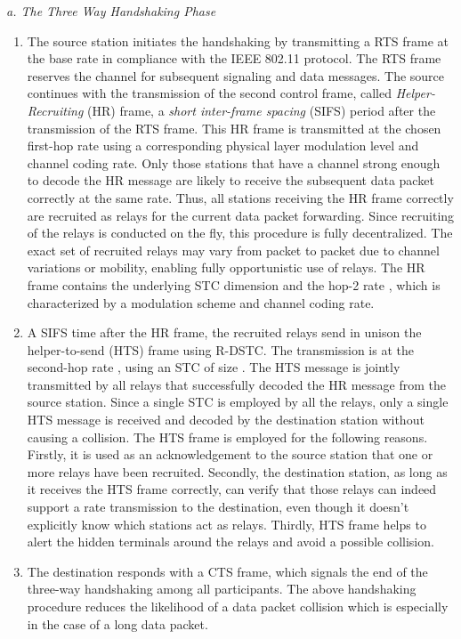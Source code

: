 \documentclass[peerreview,draftcls,onecolumn,12pt,a4paper]{IEEEtran}
\begin{document}
 {\em a. The Three Way Handshaking Phase}

\begin{enumerate}
\item The source station  initiates the handshaking by
transmitting a RTS frame at the base rate in compliance with the
IEEE 802.11 protocol. The RTS frame reserves the channel for
subsequent signaling and data messages. The source continues with
the transmission of the second control frame, called
\emph{Helper-Recruiting} (HR) frame, a \emph{short inter-frame
spacing} (SIFS) period after the transmission of the RTS frame.
This HR frame is transmitted at the chosen first-hop rate 
using a corresponding physical layer modulation level and channel
coding rate. Only those stations that have a channel strong enough
to decode the HR message are likely to receive the subsequent data
packet correctly at the same rate. Thus, all stations receiving
the HR frame correctly are recruited as relays for the current
data packet forwarding. Since recruiting of the relays is
conducted on the fly, this procedure is fully decentralized. The
exact set of recruited relays may vary from packet to packet due
to channel variations or mobility, enabling fully opportunistic
use of relays. The HR frame contains the underlying STC dimension
 and the hop-2 rate , which is characterized by a
modulation scheme and channel coding rate.

\item A SIFS time after the HR  frame, the recruited relays send
in unison the helper-to-send (HTS) frame using R-DSTC. The
transmission is at the second-hop rate , using an STC of
size . The HTS message is jointly transmitted by all relays
that successfully decoded the HR message from the source station.
Since a single STC is employed by all the relays, only a
single HTS message is received and decoded by the destination
station without causing a collision. The HTS frame is employed for
the following reasons. Firstly, it is used as an acknowledgement
to the source station that one or more relays have been recruited.
Secondly, the destination station, as long as it receives the HTS
frame correctly, can verify that those relays can indeed support a
rate  transmission to the destination, even though it doesn't explicitly know which stations act as relays. Thirdly, HTS frame
helps
to alert the hidden terminals around the relays and avoid a possible collision. 

\item The destination responds with a CTS frame, which signals the
end of the three-way handshaking among all participants. The above
handshaking procedure reduces the likelihood of a data packet
collision which is especially in the case of a long data packet.
\end{enumerate}
\end{document}
